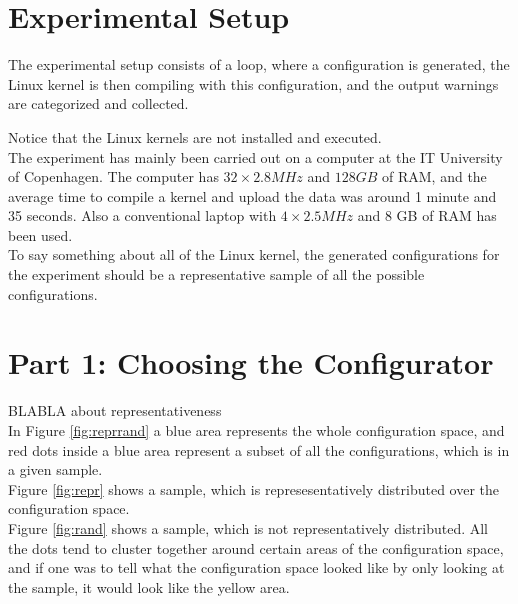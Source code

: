 \documentclass[a4paper,11pt]{report}
\begin{document}
            \section{Experimental Setup}
The experimental setup consists of a loop, where a configuration is generated,
the Linux kernel is then compiling with this configuration, and the output 
warnings are categorized and collected.

Notice that the Linux kernels are not installed and executed.
\\

The experiment has mainly been carried out on a computer at the IT University 
of Copenhagen. The computer has $32\times2.8 MHz$ and $128 GB$ of RAM, and the 
average time to compile a kernel and upload the data was around 1 minute and 35 
seconds. Also a conventional laptop with $4\times2.5 MHz$  and 8 GB of RAM has 
been used.
\\

To say something about all of the Linux kernel, the generated configurations 
for the experiment should be a representative sample of all the possible 
configurations. 



        \section{Part 1: Choosing the Configurator}
        \label{rephunt}

BLABLA about representativeness
\\


In Figure \ref{fig:reprrand} a blue area represents the whole configuration 
space, and red dots inside a blue area represent a subset of all the 
configurations, which is in a given sample.
\\

Figure \ref{fig:repr} shows a sample, which is represesentatively distributed 
over the configuration space. 
\\

Figure \ref{fig:rand} shows a sample, which is not representatively 
distributed. All the dots tend to cluster together around certain areas of the 
configuration space, and if one was to tell what the configuration space looked 
like by only looking at the sample, it would look like the yellow area.
\end{document}
